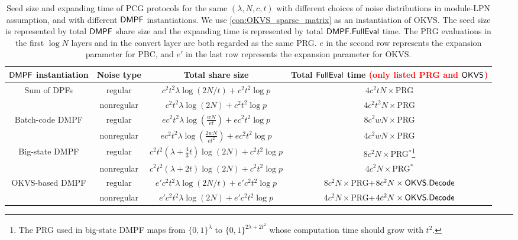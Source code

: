 \begin{table*}
    \renewcommand\arraystretch{1.5}
    \caption{Seed size and expanding time of PCG protocols for the same $(\lambda,N, c, t)$ with different choices of noise distributions in module-LPN assumption, and with different ${\sf DMPF}$ instantiations. We use \cref{con:OKVS_sparse_matrix} as an instantiation of OKVS. The seed size is represented by total ${\sf DMPF}$ share size and the expanding time is represented by total ${\sf DMPF}.{\sf FullEval}$ time. The PRG evaluations in the first $\log N$ layers and in the convert layer are both regarded as the same PRG. $e$ in the second row represents the expansion parameter for PBC, and $e'$ in the last row represents the expansion parameter for OKVS. }
	\label{tab:PCG_plug_in_formula}
		\begin{tabular}{cccc}
            \toprule
			${\sf DMPF}$ instantiation & Noise type & Total share size & Total ${\sf FullEval}$ time \textcolor{red}{(only listed PRG and ${\sf OKVS}$)} \\
            \midrule

            \multirow{2}{*}{Sum of DPFs} & regular & $c^2t^2\lambda\log(2N/t)+c^2t^2\log p$ & $4c^2tN\times$PRG \\
             & nonregular & $c^2t^2\lambda\log(2N)+c^2t^2\log p$ & $4c^2t^2N\times$PRG\\
             \cline{1-4}
            \multirow{2}{*}{Batch-code DMPF} & regular & $ec^2t^2\lambda\log(\frac{wN}{et})+ec^2t^2\log p$ & $8c^2wN\times$PRG \\
            & nonregular & $ec^2t^2\lambda\log(\frac{2wN}{et^2})+ec^2t^2\log p$ & $4c^2wN\times$PRG\\
            \cline{1-4}

            \multirow{2}{*}{Big-state DMPF} & regular & $c^2t^2(\lambda+\frac{4}{3}t)\log (2N)+c^2t^2\log p$ & $8c^2N\times$PRG$^*$\footnote{The PRG used in big-state DMPF maps from $\{0,1\}^\lambda$ to $\{0,1\}^{2\lambda+2t^2}$ whose computation time should grow with $t^2$. } \\
            & nonregular & $c^2t^2(\lambda+2t)\log (2N)+c^2t^2\log p$ & $4c^2N\times$PRG$^*$ \\
            \cline{1-4}

            \multirow{2}{*}{OKVS-based DMPF} & regular & $e'c^2t^2\lambda\log(2N/t)+e'c^2t^2\log p$ & $8c^2N\times$PRG+$8c^2N\times{\sf OKVS}.{\sf Decode}$  \\
            & nonregular & $e'c^2t^2\lambda\log(2N)+e'c^2t^2\log p$ & $4c^2N\times$PRG+$4c^2N\times{\sf OKVS}.{\sf Decode}$\\
            \bottomrule
		\end{tabular}
\end{table*}

